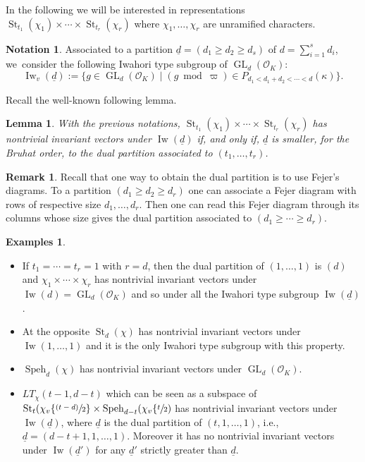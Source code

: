 \documentclass[11pt]{article}
\newcommand{\ie}{i.e.,\xspace}
\newcommand{\skpt}{\smallskip}
\let\sep\mid
\newcommand{\psfrac}[2]{\sfrac{(#1)}{#2}}
\DeclareMathOperator{\GL}{GL}
\theoremstyle{plain}
\newtheorem{lemma}[equation]{Lemma}
\theoremstyle{definition}
\newtheorem*{remark}{Remark}
\newtheorem*{examples}{Examples}
\newtheorem{nota}[equation]{Notation}
\numberwithin{equation}{subsection}
\newcommand\OC{{\mathcal O}}
\DeclareMathOperator{\Iw}{Iw}
\DeclareMathOperator{\speh}{Speh}
\DeclareMathOperator{\st}{St}
\begin{document}
In the following we will be interested in representations
$\st_{t_1}(\chi_1) \times \cdots \times \st_{t_r}(\chi_r)$ where $\chi_1,\dots,
\chi_r$ are unramified characters.

\begin{nota} \label{nota-iwh0}
Associated to a partition $\underline d=(d_1 \geq d_2 \geq d_s)$ of
$d=\sum_{i=1}^s d_i$, we~consider the following Iwahori type subgroup of
$\GL_d(\OC_K)$:
\[
\Iw_v(\underline d):=
\bigl \{g \in \GL_d(\OC_K) \sep (g \bmod \varpi) \in
P_{d_1 < d_1+d_2 < \cdots < d}(\kappa) \bigr\}.
\]
\end{nota}

Recall the well-known following lemma.

\begin{lemma} \label{lem-iwahori}
With the previous notations,
$\st_{t_1}(\chi_1) \times \cdots \times \st_{t_r}(\chi_r)$ has nontrivial
invariant vectors under $\Iw(\underline d)$ if, and only if, $\underline d$
is smaller, for the Bruhat order, to the dual partition associated to
$(t_1,\dots,t_r)$.
\end{lemma}

\begin{remark}
Recall that one way to obtain the dual partition is to use Fejer's diagrams.
To a partition $(d_1 \geq d_2 \geq d_r)$ one can associate a Fejer diagram
with rows of respective size $d_1,\dots,d_r$. Then one can read this Fejer diagram
through its columns whose size gives the dual partition associated to
$(d_1 \geq \cdots \geq d_r)$.
\end{remark}

\skpt
\begin{examples}
\begin{itemize}
\item If $t_1=\cdots=t_r=1$ with $r=d$, then the dual partition of
$(1,\dots,1)$ is $(d)$ and $\chi_1 \times \cdots \times \chi_r$ has nontrivial
invariant vectors under $\Iw(d)=\GL_d(\OC_K)$ and so under all the
Iwahori type subgroup $\Iw(\underline d)$.

\item At the opposite $\st_d(\chi)$ has nontrivial invariant vectors under
$\Iw(1,\dots,1)$ and it is the only Iwahori type subgroup with this property.

\item $\speh_d(\chi)$ has nontrivial invariant vectors under $\GL_d(\OC_K)$.

\item $LT_{\chi}(t-1,d-t)$ which can be seen as a subspace of
$\st_t(\chi_v \{\psfrac{t-d}{2}\} \times \speh_{d-t}(\chi_v \{\sfrac{t}{2})$
has nontrivial invariant vectors under $\Iw(\underline d)$, where
$\underline d$ is the dual partition of $(t,1,\dots,1)$, \ie $\underline d=(d-t+1,1,\dots,1)$. Moreover it has no nontrivial invariant
vectors under $\Iw(\underline d')$ for any $\underline d'$ strictly greater
than $\underline d$.
\end{itemize}
\end{examples}
\end{document}
